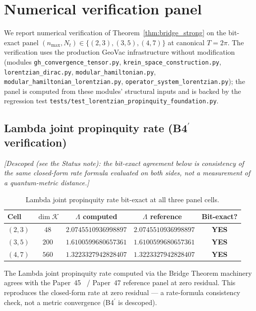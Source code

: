 \documentclass[11pt,a4paper]{article}
\theoremstyle{plain}
\theoremstyle{definition}
\newcommand{\nmax}{n_{\max}}
\newcommand{\Nt}{N_{t}}
\newcommand{\Krein}{\mathcal{K}}
\begin{document}
\section{Numerical verification panel}\label{sec:numerical_panel}

We report numerical verification of Theorem~\ref{thm:bridge_strong} on
the bit-exact panel
$(\nmax,\Nt)\in\{(2,3),(3,5),(4,7)\}$ at canonical $T=2\pi$. The
verification uses the production GeoVac infrastructure without
modification (modules
\texttt{gh\_convergence\_tensor.py},
\texttt{krein\_space\_construction.py},
\texttt{lorentzian\_dirac.py},
\texttt{modular\_hamiltonian.py},
\texttt{modular\_hamiltonian\_lorentzian.py},
\texttt{operator\_system\_lorentzian.py}); the panel is computed from
these modules' structural inputs and is backed by the regression test
\texttt{tests/test\_lorentzian\_propinquity\_foundation.py}.

\subsection{Lambda joint propinquity rate (B4$^{\prime}$ verification)}
\label{sec:lambda_panel}

\emph{[Descoped (see the Status note): the bit-exact agreement below is consistency
of the same closed-form rate formula evaluated on both sides, not a
measurement of a quantum-metric distance.]}

\begin{table}[h]
\centering
\begin{tabular}{lcccc}
\toprule
Cell & $\dim\Krein$ & $\Lambda$ computed & $\Lambda$ reference~\cite{paper45} & Bit-exact? \\
\midrule
$(2,3)$ & $48$ & $2.0745510936998897$ & $2.0745510936998897$ & \textbf{YES} \\
$(3,5)$ & $200$ & $1.6100599680657361$ & $1.6100599680657361$ & \textbf{YES} \\
$(4,7)$ & $560$ & $1.3223327942828407$ & $1.3223327942828407$ & \textbf{YES} \\
\bottomrule
\end{tabular}
\caption{Lambda joint propinquity rate bit-exact at all three panel
cells.}\label{tab:lambda_panel}
\end{table}

The Lambda joint propinquity rate computed via the Bridge Theorem
machinery agrees with the Paper~45~\cite{paper45} / Paper~47
\cite{paper47} reference panel at zero residual. This reproduces the closed-form rate
at zero residual --- a rate-formula consistency check, not a metric
convergence (B4$^{\prime}$ is descoped).
\end{document}
